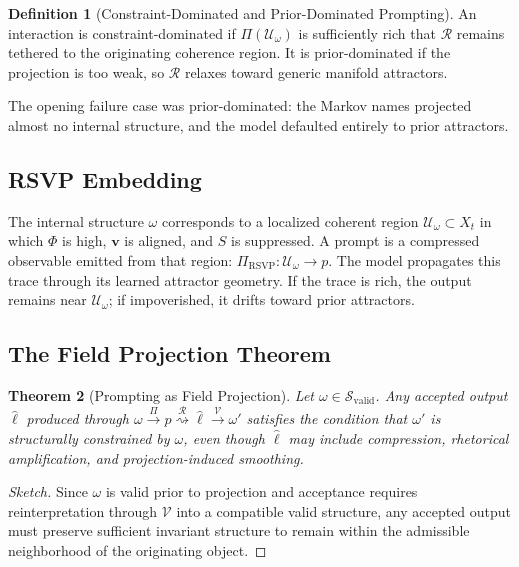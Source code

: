 \documentclass[12pt, a4paper]{article}
\newcommand{\xrightsquigarrow}[1]{%
  \mathrel{\overset{#1}{\rightsquigarrow}}%
}
\theoremstyle{plain}
\newtheorem{theorem}{Theorem}[section]
\theoremstyle{definition}
\newtheorem{definition}[theorem]{Definition}
\theoremstyle{remark}
\begin{document}
\begin{definition}[Constraint-Dominated and Prior-Dominated Prompting]
An interaction is constraint-dominated if $\Pi(\mathcal{U}_\omega)$ is sufficiently rich that $\mathcal{R}$ remains tethered to the originating coherence region. It is prior-dominated if the projection is too weak, so $\mathcal{R}$ relaxes toward generic manifold attractors.
\end{definition}

The opening failure case was prior-dominated: the Markov names projected almost no internal structure, and the model defaulted entirely to prior attractors.

\subsection{RSVP Embedding}

The internal structure $\omega$ corresponds to a localized coherent region $\mathcal{U}_\omega \subset X_t$ in which $\Phi$ is high, $\mathbf{v}$ is aligned, and $S$ is suppressed. A prompt is a compressed observable emitted from that region: $\Pi_{\mathrm{RSVP}} : \mathcal{U}_\omega \to p$. The model propagates this trace through its learned attractor geometry. If the trace is rich, the output remains near $\mathcal{U}_\omega$; if impoverished, it drifts toward prior attractors.

\subsection{The Field Projection Theorem}

\begin{theorem}[Prompting as Field Projection]
\label{thm:prompting}
Let $\omega \in \mathcal{S}_{\mathrm{valid}}$. Any accepted output $\hat{\ell}$ produced through $\omega \xrightarrow{\Pi} p \xrightsquigarrow{\mathcal{R}} \hat{\ell} \xrightarrow{\mathcal{V}} \omega'$ satisfies the condition that $\omega'$ is structurally constrained by $\omega$, even though $\hat{\ell}$ may include compression, rhetorical amplification, and projection-induced smoothing.
\end{theorem}

\begin{proof}[Sketch]
Since $\omega$ is valid prior to projection and acceptance requires reinterpretation through $\mathcal{V}$ into a compatible valid structure, any accepted output must preserve sufficient invariant structure to remain within the admissible neighborhood of the originating object.
\end{proof}
\end{document}
